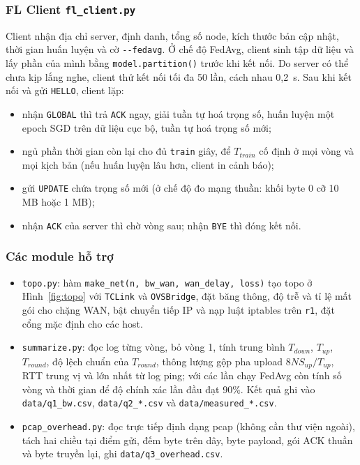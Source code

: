 \subsubsection{FL Client \texttt{fl\_client.py}}
Client nhận địa chỉ server, định danh, tổng số node, kích thước bản cập nhật, thời gian huấn luyện và cờ \texttt{-{}-fedavg}. Ở chế độ FedAvg, client sinh tập dữ liệu và lấy phần của mình bằng \texttt{model.partition()} trước khi kết nối. Do server có thể chưa kịp lắng nghe, client thử kết nối tối đa 50 lần, cách nhau 0{,}2~s. Sau khi kết nối và gửi \texttt{HELLO}, client lặp:
\begin{itemize}
    \item nhận \texttt{GLOBAL} thì trả \texttt{ACK} ngay, giải tuần tự hoá trọng số, huấn luyện một epoch SGD trên dữ liệu cục bộ, tuần tự hoá trọng số mới;
    \item ngủ phần thời gian còn lại cho đủ \texttt{train} giây, để $T_{train}$ cố định ở mọi vòng và mọi kịch bản (nếu huấn luyện lâu hơn, client in cảnh báo);
    \item gửi \texttt{UPDATE} chứa trọng số mới (ở chế độ đo mạng thuần: khối byte 0 cỡ 10 MB hoặc 1 MB);
    \item nhận \texttt{ACK} của server thì chờ vòng sau; nhận \texttt{BYE} thì đóng kết nối.
\end{itemize}

\subsubsection{Các module hỗ trợ}
\begin{itemize}
    \item \texttt{topo.py}: hàm \texttt{make\_net(n, bw\_wan, wan\_delay, loss)} tạo topo ở Hình~\ref{fig:topo} với \texttt{TCLink} và \texttt{OVSBridge}, đặt băng thông, độ trễ và tỉ lệ mất gói cho chặng WAN, bật chuyển tiếp IP và nạp luật iptables trên \texttt{r1}, đặt cổng mặc định cho các host.
    \item \texttt{summarize.py}: đọc log từng vòng, bỏ vòng 1, tính trung bình $T_{down}$, $T_{up}$, $T_{round}$, độ lệch chuẩn của $T_{round}$, thông lượng gộp pha upload $8NS_{up}/T_{up}$, RTT trung vị và lớn nhất từ log ping; với các lần chạy FedAvg còn tính số vòng và thời gian để độ chính xác lần đầu đạt 90\%. Kết quả ghi vào \texttt{data/q1\_bw.csv}, \texttt{data/q2\_*.csv} và \texttt{data/measured\_*.csv}.
    \item \texttt{pcap\_overhead.py}: đọc trực tiếp định dạng pcap (không cần thư viện ngoài), tách hai chiều tại điểm gửi, đếm byte trên dây, byte payload, gói ACK thuần và byte truyền lại, ghi \texttt{data/q3\_overhead.csv}.
\end{itemize}

